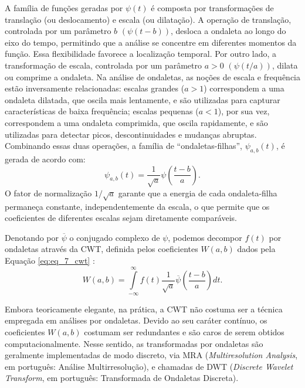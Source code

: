 A família de funções geradas por \(\psi(t)\) é composta por transformações de translação (ou deslocamento) e escala (ou dilatação). A operação de translação, controlada por um parâmetro \(b\) \((\psi(t-b))\), desloca a ondaleta ao longo do eixo do tempo, permitindo que a análise se concentre em diferentes momentos da função. Essa flexibilidade favorece a localização temporal. Por outro lado, a transformação de escala, controlada por um parâmetro \(a > 0\) \((\psi(t/a))\), dilata ou comprime a ondaleta. Na análise de ondaletas, as noções de escala e frequência estão inversamente relacionadas: escalas grandes (\(a > 1\)) correspondem a uma ondaleta dilatada, que oscila mais lentamente, e são utilizadas para capturar características de baixa frequência; escalas pequenas (\(a < 1\)), por sua vez, correspondem a uma ondaleta comprimida, que oscila rapidamente, e são utilizadas para detectar picos, descontinuidades e mudanças abruptas. Combinando essas duas operações, a família de ``ondaletas-filhas'', \(\psi_{a,b}(t)\), é gerada de acordo com:
\begin{equation}
    \psi_{a,b}(t) = \frac{1}{\sqrt{a}} \psi\left(\frac{t-b}{a}\right).
    \label{eq:eq_6_wavelet_family}
\end{equation}
O fator de normalização \(1/\sqrt{a}\) garante que a energia de cada ondaleta-filha permaneça constante, independentemente da escala, o que permite que os coeficientes de diferentes escalas sejam diretamente comparáveis.

Denotando por \(\overline{\psi}\) o conjugado complexo de \(\psi\), podemos decompor \(f(t)\) por ondaletas através da CWT, definida pelos coeficientes \(W(a, b)\) dados pela Equação \ref{eq:eq_7_cwt} \cite{vidakovic_statistical_1999}:
\begin{equation}
    W(a,b) = \int\limits_{-\infty}^{\infty} f(t) \frac{1}{\sqrt{a}} \overline{\psi}\left(\frac{t-b}{a}\right) dt.
    \label{eq:eq_7_cwt}
\end{equation}

Embora teoricamente elegante, na prática, a CWT não costuma ser a técnica empregada em análises por ondaletas. 
Devido ao seu caráter contínuo, os coeficientes \(W(a, b)\) costumam ser redundantes e são caros de serem obtidos computacionalmente. 
Nesse sentido, as transformadas por ondaletas são geralmente implementadas de modo discreto, via MRA (\emph{Multiresolution Analysis}, em português: Análise Multirresolução), e chamadas de DWT (\emph{Discrete Wavelet Transform}, em português: Transformada de Ondaletas Discreta).

